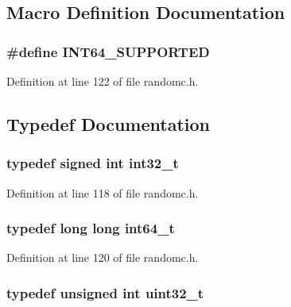 \subsection{Macro Definition Documentation}
\subsubsection[{I\-N\-T64\-\_\-\-S\-U\-P\-P\-O\-R\-T\-E\-D}]{\setlength{\rightskip}{0pt plus 5cm}\#define I\-N\-T64\-\_\-\-S\-U\-P\-P\-O\-R\-T\-E\-D}\label{rnd_2randomc_8h_abd7f6b8d71fd6d675f8899cc48092bfc}


Definition at line 122 of file randomc.\-h.



\subsection{Typedef Documentation}
\subsubsection[{int32\-\_\-t}]{\setlength{\rightskip}{0pt plus 5cm}typedef signed int {\bf int32\-\_\-t}}\label{rnd_2randomc_8h_ab1967d8591af1a4e48c37fd2b0f184d0}


Definition at line 118 of file randomc.\-h.

\subsubsection[{int64\-\_\-t}]{\setlength{\rightskip}{0pt plus 5cm}typedef long long {\bf int64\-\_\-t}}\label{rnd_2randomc_8h_a996e72f71b11a5bb8b3b7b6936b1516d}


Definition at line 120 of file randomc.\-h.

\subsubsection[{uint32\-\_\-t}]{\setlength{\rightskip}{0pt plus 5cm}typedef unsigned int {\bf uint32\-\_\-t}}\label{rnd_2randomc_8h_a435d1572bf3f880d55459d9805097f62}


